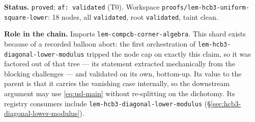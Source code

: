 \medskip
\noindent\textbf{Status.} \texttt{proved}; \texttt{af: validated} (T0). Workspace
\texttt{proofs/lem-hcb3-uniform-square-lower}: 18 nodes, all \texttt{validated}, root
\texttt{validated}, taint clean.

\noindent\textbf{Role in the chain.} Imports \texttt{lem-compcb-corner-algebra}. This
shard exists because of a recorded balloon abort: the first orchestration of
\texttt{lem-hcb3-diagonal-lower-modulus} tripped the node cap on exactly this claim, so it
was factored out of that tree --- its statement extracted mechanically from the blocking
challenges --- and validated on its own, bottom-up. Its value to the parent is that it
carries the vanishing case internally, so the downstream argument may use
\eqref{eq:usl-main} without re-splitting on the dichotomy. Its registry consumers include
\texttt{lem-hcb3-diagonal-lower-modulus} (\S\ref{sec:hcb3-diagonal-lower-modulus}).
